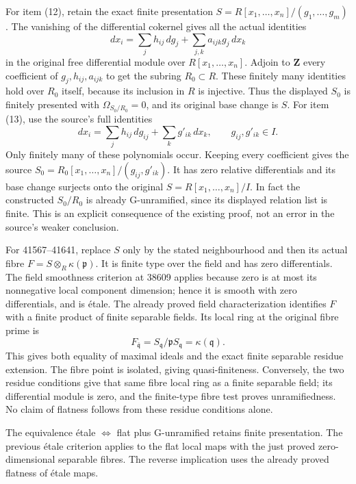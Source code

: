 For item (12), retain the exact finite presentation \(S=R[x_1,\ldots,x_n]/(g_1,\ldots,g_m)\). The vanishing of the differential cokernel gives all the actual identities \[
dx_i=\sum_j h_{ij}\,dg_j+\sum_{j,k}a_{ijk}g_j\,dx_k
\] in the original free differential module over \(R[x_1,\ldots,x_n]\). Adjoin to \(\mathbf Z\) every coefficient of \(g_j,h_{ij},a_{ijk}\) to get the subring \(R_0\subset R\). These finitely many identities hold over \(R_0\) itself, because its inclusion in \(R\) is injective. Thus the displayed \(S_0\) is finitely presented with \(\Omega_{S_0/R_0}=0\), and its original base change is \(S\). For item (13), use the source's full identities \[
dx_i=\sum_j h_{ij}\,dg_{ij}+\sum_k g'_{ik}\,dx_k,\qquad
g_{ij},g'_{ik}\in I.
\] Only finitely many of these polynomials occur. Keeping every coefficient gives the source \(S_0=R_0[x_1,\ldots,x_n]/(g_{ij},g'_{ik})\). It has zero relative differentials and its base change surjects onto the original \(S=R[x_1,\ldots,x_n]/I\). In fact the constructed \(S_0/R_0\) is already G-unramified, since its displayed relation list is finite. This is an explicit consequence of the existing proof, not an error in the source's weaker conclusion.

For 41567--41641, replace \(S\) only by the stated neighbourhood and then its actual fibre \(F=S\otimes_R\kappa(\mathfrak p)\). It is finite type over the field and has zero differentials. The field smoothness criterion at 38609 applies because zero is at most its nonnegative local component dimension; hence it is smooth with zero differentials, and is étale. The already proved field characterization identifies \(F\) with a finite product of finite separable fields. Its local ring at the original fibre prime is \[
F_{\bar{\mathfrak q}}=S_{\mathfrak q}/\mathfrak pS_{\mathfrak q}
=\kappa(\mathfrak q).
\] This gives both equality of maximal ideals and the exact finite separable residue extension. The fibre point is isolated, giving quasi-finiteness. Conversely, the two residue conditions give that same fibre local ring as a finite separable field; its differential module is zero, and the finite-type fibre test proves unramifiedness. No claim of flatness follows from these residue conditions alone.

The equivalence étale \(\Leftrightarrow\) flat plus G-unramified retains finite presentation. The previous étale criterion applies to the flat local maps with the just proved zero-dimensional separable fibres. The reverse implication uses the already proved flatness of étale maps.

